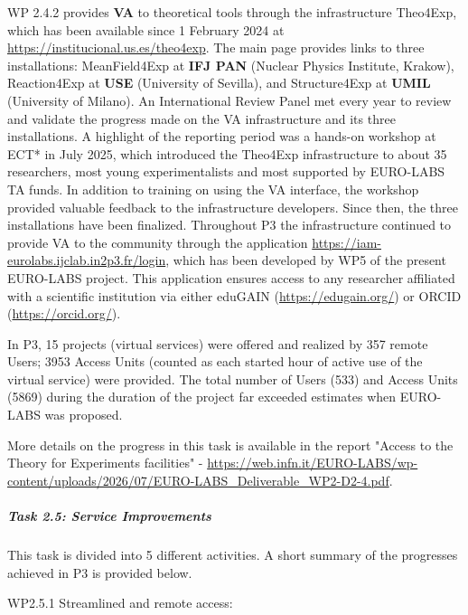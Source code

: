 WP 2.4.2 provides \textbf{VA} to theoretical tools through the infrastructure Theo4Exp, which has been available since 1 February 2024 at \url{https://institucional.us.es/theo4exp}. The main page provides links to three installations: MeanField4Exp at \textbf{IFJ PAN} (Nuclear Physics Institute, Krakow), Reaction4Exp at \textbf{USE} (University of Sevilla), and Structure4Exp at \textbf{UMIL} (University of Milano). An International Review Panel met every year to review and validate the progress made on the VA infrastructure and its three installations. A highlight of the reporting period was a hands-on workshop at ECT* in July 2025, which introduced the Theo4Exp infrastructure to about 35 researchers, most young experimentalists and most supported by EURO-LABS TA funds. In addition to training on using the VA interface, the workshop provided valuable feedback to the infrastructure developers. Since then, the three installations have been finalized. Throughout P3 the infrastructure continued to provide VA to the community through the application \url{https://iam-eurolabs.ijclab.in2p3.fr/login}, which has been developed by WP5 of the present EURO-LABS project. This application ensures access to any researcher affiliated with a scientific institution via either eduGAIN (\url{https://edugain.org/}) or ORCID (\url{https://orcid.org/}). 

In P3, 15 projects (virtual services) were offered and realized by 357 remote Users; 3953 Access Units (counted as each started hour of active use of the virtual service) were provided. The total number of Users (533) and Access Units (5869) during the duration of the project far exceeded estimates when EURO-LABS was proposed.

More details on the progress in this task is available in the report "Access to the Theory for Experiments facilities" - \url{https://web.infn.it/EURO-LABS/wp-content/uploads/2026/07/EURO-LABS_Deliverable_WP2-D2-4.pdf}.

\subparagraph{Task 2.5: Service Improvements } \mbox{}



This task is divided into 5 different activities. A short summary of the progresses achieved in P3 is provided below.

WP2.5.1 Streamlined and remote access:

